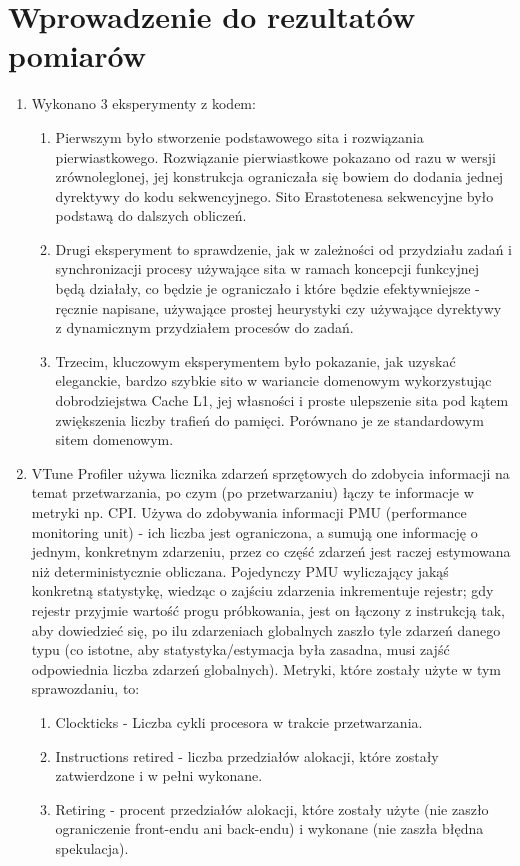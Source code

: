 \documentclass[12pt]{article}
\begin{document}
\section {Wprowadzenie do rezultatów pomiarów}
\begin{enumerate}
	\item Wykonano 3 eksperymenty z kodem:
	\begin{enumerate}
		\item Pierwszym było stworzenie podstawowego sita i rozwiązania pierwiastkowego. Rozwiązanie pierwiastkowe pokazano od razu w wersji zrównoleglonej, jej konstrukcja ograniczała się bowiem do dodania jednej dyrektywy do kodu sekwencyjnego. Sito Erastotenesa sekwencyjne było podstawą do dalszych obliczeń.
		\item Drugi eksperyment to sprawdzenie, jak w zależności od przydziału zadań i synchronizacji procesy używające sita w ramach koncepcji funkcyjnej będą działały, co będzie je ograniczało i które będzie efektywniejsze - ręcznie napisane, używające prostej heurystyki czy używające dyrektywy z dynamicznym przydziałem procesów do zadań.
		\item Trzecim, kluczowym eksperymentem było pokazanie, jak uzyskać eleganckie, bardzo szybkie sito w wariancie domenowym wykorzystując dobrodziejstwa Cache L1, jej własności i proste ulepszenie sita pod kątem zwiększenia liczby trafień do pamięci. Porównano je ze standardowym sitem domenowym.
	\end{enumerate}

	\item VTune Profiler używa licznika zdarzeń sprzętowych do zdobycia informacji na temat przetwarzania, po czym (po przetwarzaniu) łączy te informacje w metryki np. CPI. Używa do zdobywania informacji PMU (performance monitoring unit) - ich liczba jest ograniczona, a sumują one informację o jednym, konkretnym zdarzeniu, przez co część zdarzeń jest raczej estymowana niż deterministycznie obliczana. Pojedynczy PMU wyliczający jakąś konkretną statystykę, wiedząc o zajściu zdarzenia inkrementuje rejestr; gdy rejestr przyjmie wartość progu próbkowania, jest on łączony z instrukcją tak, aby dowiedzieć się, po ilu zdarzeniach globalnych zaszło tyle zdarzeń danego typu (co istotne, aby statystyka/estymacja była zasadna, musi zajść odpowiednia liczba zdarzeń globalnych). Metryki, które zostały użyte w tym sprawozdaniu, to: 
	
	\begin{enumerate}
		\item Clockticks - Liczba cykli procesora w trakcie przetwarzania.
		\item Instructions retired - liczba przedziałów alokacji, które zostały zatwierdzone i w pełni wykonane.
		\item Retiring - procent przedziałów alokacji, które zostały użyte (nie zaszło ograniczenie front-endu ani back-endu) i wykonane (nie zaszła błędna spekulacja).
		

\end{enumerate}
\end{enumerate}
\end{document}
